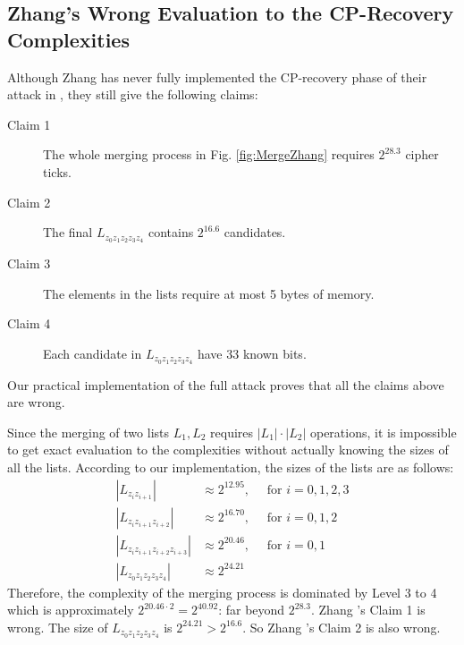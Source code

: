 \subsection{Zhang's Wrong Evaluation to the CP-Recovery Complexities}\label{sec:ZhangWrongCompAnalysis}
Although Zhang \etal has never fully implemented the CP-recovery phase of their attack in \cite{AC:Zhang19}, they still give the following claims:
\begin{description}
  \item[Claim 1] The whole merging process in Fig. \ref{fig:MergeZhang} requires $2^{28.3}$ cipher ticks.
  \item[Claim 2] The final $L_{z_0z_1z_2z_3z_4}$ contains $2^{16.6}$ candidates.
  \item[Claim 3] The elements in the lists require at most 5 bytes of memory.
  \item[Claim 4] Each candidate in $L_{z_0z_1z_2z_3z_4}$ have 33 known bits.
\end{description}
Our practical implementation of the full attack proves that all the claims above are wrong. 


Since the merging of two lists $L_1,L_2$ requires $|L_1|\cdot |L_2|$ operations, it is impossible to get exact evaluation to the complexities without actually knowing the sizes of all the lists.
According to our implementation, the sizes of the lists are as follows:
\begin{equation}\label{eq:ListSizes}
  \begin{aligned}
  |L_{z_iz_{i+1}}| &\approx 2^{12.95},\quad \text{ for } i=0,1,2, 3 \\
  |L_{z_iz_{i+1}z_{i+2}}| & \approx 2^{16.70},  \quad \text{ for } i=0,1, 2\\
  |L_{z_iz_{i+1}z_{i+2}z_{i+3}}| & \approx 2^{20.46},  \quad \text{ for } i=0, 1\\
  |L_{z_0z_{1}z_{2}z_{3}z_{4}}| & \approx 2^{24.21}
  \end{aligned}
\end{equation}
Therefore, the complexity of the merging process is dominated by Level 3 to 4 which is approximately $2^{20.46\cdot 2}=2^{40.92}$: far beyond $2^{28.3}$.
Zhang \etal's Claim 1 is wrong.
The size of $L_{z_0z_1z_2z_3z_4}$ is $2^{24.21}> 2^{16.6}$.
So Zhang \etal's Claim 2 is also wrong.

